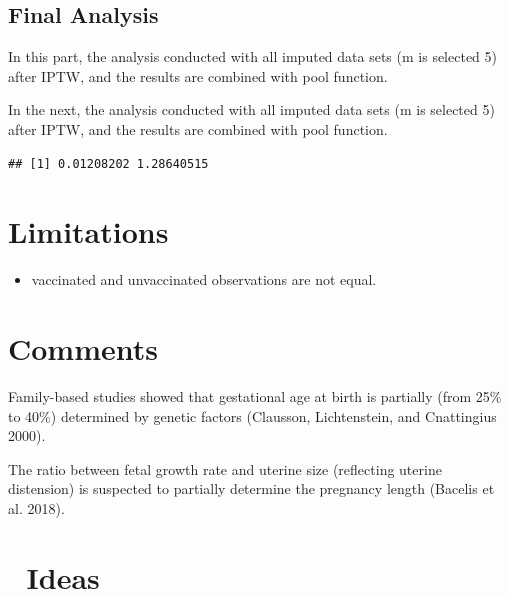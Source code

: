 \documentclass[
]{article}
\newenvironment{Shaded}{\begin{snugshade}}{\end{snugshade}}
\newcommand{\KeywordTok}[1]{\textcolor[rgb]{0.13,0.29,0.53}{\textbf{#1}}}
\newcommand{\NormalTok}[1]{#1}
\newcommand{\OperatorTok}[1]{\textcolor[rgb]{0.81,0.36,0.00}{\textbf{#1}}}
\newcommand{\StringTok}[1]{\textcolor[rgb]{0.31,0.60,0.02}{#1}}
\providecommand{\tightlist}{%
  \setlength{\itemsep}{0pt}\setlength{\parskip}{0pt}}
\begin{document}
\hypertarget{final-analysis}{%
\subsection{Final Analysis}\label{final-analysis}}

In this part, the analysis conducted with all imputed data sets (m is
selected 5) after IPTW, and the results are combined with pool function.

In the next, the analysis conducted with all imputed data sets (m is
selected 5) after IPTW, and the results are combined with pool function.

\begin{Shaded}
\end{Shaded}

\begin{verbatim}
## [1] 0.01208202 1.28640515
\end{verbatim}

\hypertarget{limitations}{%
\section{Limitations}\label{limitations}}

\begin{itemize}
\tightlist
\item
  vaccinated and unvaccinated observations are not equal.
\end{itemize}

\hypertarget{comments}{%
\section{Comments}\label{comments}}

Family-based studies showed that gestational age at birth is partially
(from 25\% to 40\%) determined by genetic factors (Clausson,
Lichtenstein, and Cnattingius 2000).

The ratio between fetal growth rate and uterine size (reflecting uterine
distension) is suspected to partially determine the pregnancy length
(Bacelis et al. 2018).

\hypertarget{ideas}{%
\section{🚀 Ideas}\label{ideas}}
\end{document}
